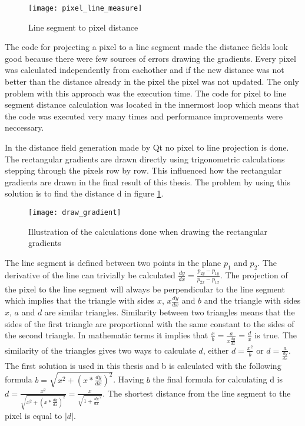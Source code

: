\begin{figure}[H]
\texttt{[image: pixel\_line\_measure]}
\caption{Line segment to pixel distance}
\end{figure}

The code for projecting a pixel to a line segment made the distance fields look good because there were few sources of errors drawing the gradients. Every pixel was calculated independently from eachother and if the new distance was not better than the distance already in the pixel the pixel was not updated. The only problem with this approach was the execution time. The code for pixel to line segment distance calculation was located in the innermost loop which means that the code was executed very many times and performance improvements were neccessary.

In the distance field generation made by Qt no pixel to line projection is done. The rectangular gradients are drawn directly using trigonometric calculations stepping through the pixels row by row. This influenced how the rectangular gradients are drawn in the final result of this thesis. The problem by using this solution is to find the distance d in figure \ref{fig:distanced}.

\begin{figure}[H]
\texttt{[image: draw\_gradient]}
\caption{Illustration of the calculations done when drawing the rectangular gradients}
\label{fig:distanced}
\end{figure}

The line segment is defined between two points in the plane $p_1$ and $p_2$. The derivative of the line can trivially be calculated $\frac{dy}{dx}=\frac{p_{2y}-p_{1y}}{p_{2x}-p_{1x}}$. The projection of the pixel to the line segment will always be perpendicular to the line segment which implies that the triangle with sides $x$, $x\frac{dy}{dx}$ and $b$ and the triangle with sides $x$, $a$ and $d$ are similar triangles. Similarity between two triangles means that the sides of the first triangle are proportional with the same constant to the sides of the second triangle. In mathematic terms it implies that $\frac{x}{b}=\frac{a}{x\frac{dy}{dx}}=\frac{d}{x}$ is true. The similarity of the triangles gives two ways to calculate $d$, either $d=\frac{x^2}{b}$ or $d=\frac{a}{\frac{dy}{dx}}$. The first solution is used in this thesis and b is calculated with the following formula $b=\sqrt{x^2+(x*\frac{dy}{dx})^2}$. Having $b$ the final formula for calculating d is $d=\frac{x^2}{\sqrt{x^2+(x*\frac{dy}{dx})^2}}=\frac{x}{\sqrt{1+\frac{dy}{dx}^2}}$. The shortest distance from the line segment to the pixel is equal to $|d|$.

